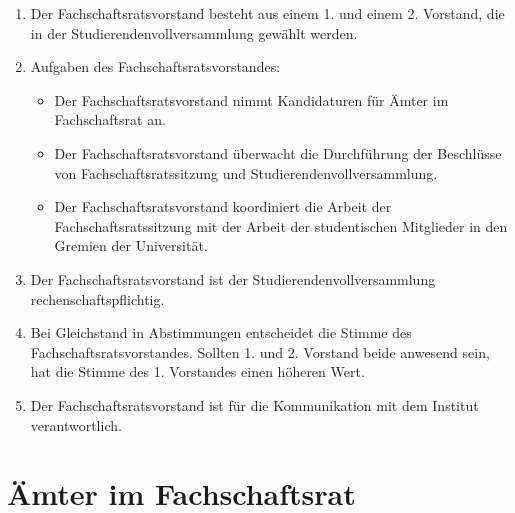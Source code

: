 \documentclass[12pt]{scrartcl}
\begin{document}
\begin{enumerate}
	\item Der Fachschaftsratsvorstand besteht aus einem 1. und einem 2. Vorstand, die in der Studierendenvollversammlung gewählt werden.
	\item Aufgaben des Fachschaftsratsvorstandes:
	\begin{itemize}
		\item Der Fachschaftsratsvorstand nimmt Kandidaturen für Ämter im Fachschaftsrat an.
		\item Der Fachschaftsratsvorstand überwacht die Durchführung der Beschlüsse von Fachschaftsratssitzung und Studierendenvollversammlung.
		\item Der Fachschaftsratsvorstand koordiniert die Arbeit der Fachschaftsratssitzung mit der Arbeit der studentischen Mitglieder in den Gremien der Universität.
	\end{itemize}
	\item Der Fachschaftsratsvorstand ist der Studierendenvollversammlung rechenschaftspflichtig.
	\item Bei Gleichstand in Abstimmungen entscheidet die Stimme des Fachschaftsratsvorstandes. Sollten 1. und 2. Vorstand beide anwesend sein, hat die Stimme des 1. Vorstandes einen höheren Wert.
	\item Der Fachschaftsratsvorstand ist für die Kommunikation mit dem Institut verantwortlich.
\end{enumerate}

\section{Ämter im Fachschaftsrat}
\end{document}
